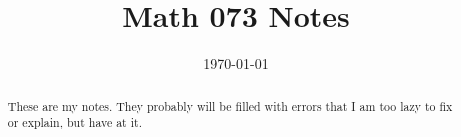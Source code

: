 \documentclass[11pt]{scrreport}
\title{Math 073 Notes}
\date{\today}
\begin{document}
\maketitle

\begin{abstract}
    These are my notes. They probably will be filled with errors that I am too lazy to fix or explain, but have at it.
\end{abstract}

\pagebreak




\end{document}
